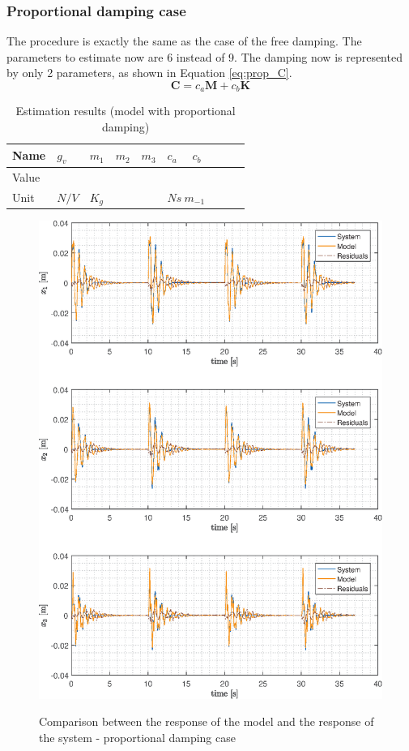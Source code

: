 \documentclass[twosided,a4paper]{article}           %
\begin{document}
\subsubsection{Proportional damping case}
The procedure is exactly the same as the case of the free damping. The parameters to estimate now are 6 instead of 9. The damping now is represented by only 2 parameters, as shown in Equation \eqref{eq:prop_C}.
\begin{equation}
	\label{eq:prop_C}
	\bm{C} = c_a\bm{M} + c_b\bm{K}
\end{equation}
\begin{table}[H]
	\centering
	\label{tab:est_prop_results}
	\begin{tabular}{|l|l|l|l|l|l|l|l|l|l|}
		\hline
		Name & $g_v$ &  $m_1$ & $m_2$ & $m_3$  &  $c_a$ & $c_b$  \\
		\hline
		Value &  &  &  &  &  &  \\ 
		\hline
		Unit & $N/V$ &  \multicolumn{3}{l|}{$K_g$}  &  \multicolumn{2}{l|}{$Ns \ m_{-1}$} \\
		\hline
	\end{tabular}
	\caption{Estimation results (model with proportional damping)}
\end{table}
\begin{figure}[H]
	\centering
	\caption{Comparison between the response of the model and the response of the system - proportional damping case}
	\includegraphics[width=\linewidth]{img/compare_p}
	\label{fig:compare_p}
\end{figure}
\end{document}
